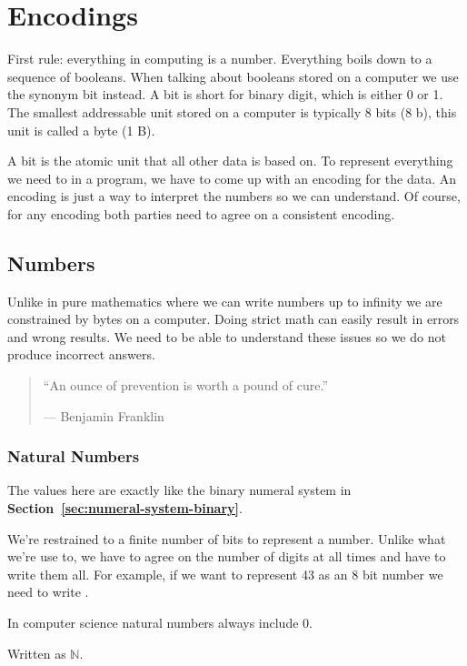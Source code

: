 \chapter{Encodings}

First rule: everything in computing is a number. Everything boils down to a
sequence of booleans. When talking about booleans stored on a computer we use
the synonym bit instead. A bit is short for binary digit, which is either 0 or
1. The smallest addressable unit stored on a computer is typically 8 bits (8 b),
this unit is called a byte (1 B).

A bit is the atomic unit that all other data is based on. To represent
everything we need to in a program, we have to come up with an encoding for the
data. An encoding is just a way to interpret the numbers so we can understand.
Of course, for any encoding both parties need to agree on a consistent encoding.

\section{Numbers}

Unlike in pure mathematics where we can write numbers up to infinity we are
constrained by bytes on a computer. Doing strict math can easily result in
errors and wrong results. We need to be able to understand these issues so we do
not produce incorrect answers.

\begin{quote}
  “An ounce of prevention is worth a pound of cure.”

  --- Benjamin Franklin
\end{quote}

\subsection{Natural Numbers}

The values here are exactly like the binary numeral system in
\textbf{Section~\ref{sec:numeral-system-binary}}.

We're restrained to a finite number of bits to represent a number.
Unlike what we're use to, we have to agree on the number of digits at all times
and have to write them all.
For example, if we want to represent 43 as an 8 bit number we need to write
.

In computer science natural numbers always include 0.

Written as $\mathbb{N}$.

